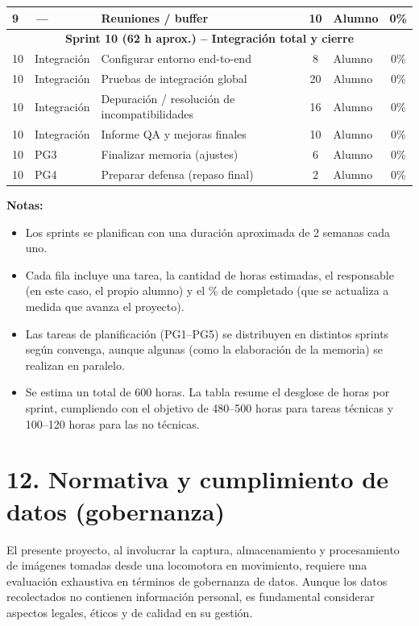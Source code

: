 \documentclass[
11pt, %
]{ProyectoVpC}
\begin{document}
\begin{center}
\begin{tabular}{|l|l|l|c|l|c|}
9 & \textit{---} & Reuniones / buffer & 10 & Alumno & 0\% \\
\hline
\multicolumn{6}{|c|}{\textbf{Sprint 10 (62 h aprox.) -- Integración total y cierre}} \\
\hline
10 & Integración & Configurar entorno end-to-end & 8 & Alumno & 0\% \\
10 & Integración & Pruebas de integración global & 20 & Alumno & 0\% \\
10 & Integración & Depuración / resolución de incompatibilidades & 16 & Alumno & 0\% \\
10 & Integración & Informe QA y mejoras finales & 10 & Alumno & 0\% \\
10 & PG3 & Finalizar memoria (ajustes) & 6 & Alumno & 0\% \\
10 & PG4 & Preparar defensa (repaso final) & 2 & Alumno & 0\% \\
\hline
\end{tabular}
\end{center}
\noindent
\textbf{Notas:}
\begin{itemize}
  \item Los sprints se planifican con una duración aproximada de 2 semanas cada uno. 
  \item Cada fila incluye una tarea, la cantidad de horas estimadas, el responsable (en este caso, el propio alumno) y el \% de completado (que se actualiza a medida que avanza el proyecto).
  \item Las tareas de planificación (PG1--PG5) se distribuyen en distintos sprints según convenga, aunque algunas (como la elaboración de la memoria) se realizan en paralelo.
  \item Se estima un total de 600 horas. La tabla resume el desglose de horas por sprint, cumpliendo con el objetivo de 480--500 horas para tareas técnicas y 100--120 horas para las no técnicas.
\end{itemize}

\section{12. Normativa y cumplimiento de datos (gobernanza)}

El presente proyecto, al involucrar la captura, almacenamiento y procesamiento de imágenes tomadas desde una locomotora en movimiento, requiere una evaluación exhaustiva en términos de gobernanza de datos. Aunque los datos recolectados no contienen información personal, es fundamental considerar aspectos legales, éticos y de calidad en su gestión.
\end{document}
